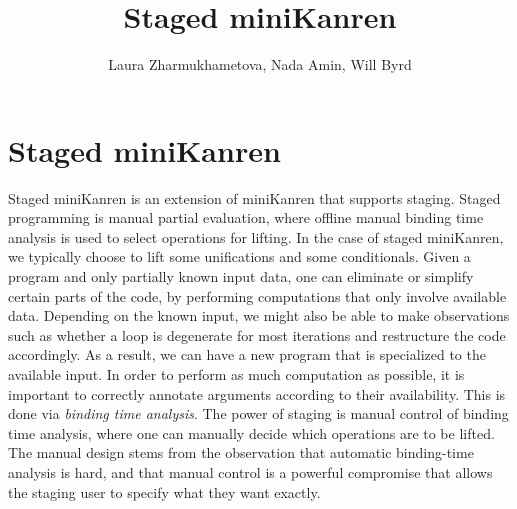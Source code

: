 \documentclass[11pt]{article}
\author{Laura Zharmukhametova, Nada Amin, Will Byrd}
\title{Staged miniKanren}
\theoremstyle{definition}
\newcommand\tab[1][1cm]{\hspace*{#1}}
\begin{document}
\normalsize
{}\baselineskip
\section{Staged miniKanren}
\tab Staged miniKanren is an extension of miniKanren that supports staging. Staged programming is manual partial evaluation, where offline manual binding time analysis is used to select operations for lifting. In the case of staged miniKanren, we typically choose to lift some unifications and some conditionals.\newline 
\tab Given a program and only partially known input data, one can eliminate or simplify certain parts of the code, by performing computations that only involve available data. Depending on the known input, we might also be able to make observations such as whether a loop is degenerate for most iterations and restructure the code accordingly. As a result, we can have a new program that is specialized to the available input. \newline 
\tab In order to perform as much computation as possible, it is important to correctly annotate arguments according to their availability. This is done via \textit{binding time analysis}. \newline 
\tab The power of staging is manual control of binding time analysis, where one can manually decide which operations are to be lifted. The manual design stems from the observation that automatic binding-time analysis is hard, and that manual control is a powerful compromise that allows the staging user to specify what they want exactly.
\end{document}

